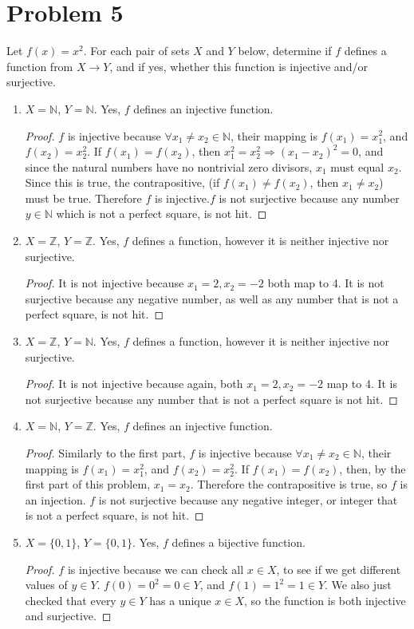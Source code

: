 \documentclass[12pt]{article}
\newcommand{\N}{\mathbb{N}}
\newcommand{\Z}{\mathbb{Z}}
\begin{document}
\section{Problem 5}
Let $f(x)=x^2$. For each pair of sets $X$ and $Y$ below, determine if $f$ defines a function from $X\to Y$, and if yes, whether this function is injective and/or surjective.
\begin{enumerate}
    \item $X=\N$, $Y=\N$. Yes, $f$ defines an injective function. \begin{proof}
    $f$ is injective because $\forall x_1\neq x_2\in\N$, their mapping is $f(x_1)=x_{1}^2$, and $f(x_2)=x_2^2$. If $f(x_1)=f(x_2)$, then $x_1^2=x_2^2\Longrightarrow (x_1-x_2)^2=0$, and since the natural numbers have no nontrivial zero divisors, $x_1$ must equal $x_2$. Since this is true, the contrapositive, (if $f(x_1)\neq f(x_2)$, then $x_1\neq x_2$) must be true. Therefore $f$ is injective.\newline $f$ is not surjective because any number $y\in\N$ which is not a perfect square, is not hit.\end{proof}
    \item $X=\Z$, $Y=\Z$. Yes, $f$ defines a function, however it is neither injective nor surjective. \begin{proof}
    It is not injective because $x_1=2,x_2=-2$ both map to 4. It is not surjective because any negative number, as well as any number that is not a perfect square, is not hit.\end{proof}
    \item $X=\Z$, $Y=\N$. Yes, $f$ defines a function, however it is neither injective nor surjective. \begin{proof}
    It is not injective because again, both $x_1=2,x_2=-2$ map to 4. It is not surjective because any number that is not a perfect square is not hit.\end{proof}
    \item $X=\N$, $Y=\Z$. Yes, $f$ defines an injective function. \begin{proof}
    Similarly to the first part, $f$ is injective because $\forall x_1\neq x_2\in\N$, their mapping is $f(x_1)=x_{1}^2$, and $f(x_2)=x_2^2$. If $f(x_1)=f(x_2)$, then, by the first part of this problem, $x_1=x_2$. Therefore the contrapositive is true, so $f$ is an injection. \newline $f$ is not surjective because any negative integer, or integer that is not a perfect square, is not hit.\end{proof}
    \item $X=\{0,1\}$, $Y=\{0,1\}$. Yes, $f$ defines a bijective function. \begin{proof}
    $f$ is injective because we can check all $x\in X$, to see if we get different values of $y\in Y$. $f(0)=0^2=0\in Y$, and $f(1)=1^2=1\in Y$. We also just checked that every $y\in Y$ has a unique $x\in X$, so the function is both injective and surjective.\end{proof}
\end{enumerate}
\end{document}
